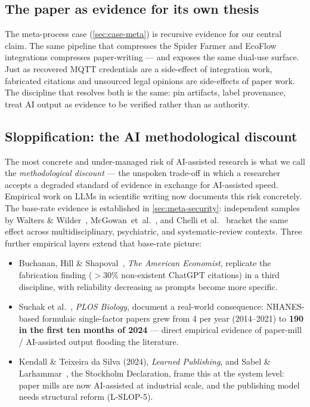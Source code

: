 \documentclass[11pt,a4paper]{article}
\begin{document}
\subsection{The paper as evidence for its own thesis}
\label{sec:disc-recursion}
The meta-process case (\cref{sec:case-meta}) is recursive evidence for
our central claim. The same pipeline that compresses the Spider Farmer
and EcoFlow integrations compresses paper-writing --- and exposes the
same dual-use surface. Just as recovered MQTT credentials are a
side-effect of integration work, fabricated citations and unsourced
legal opinions are side-effects of paper work. The discipline that
resolves both is the same: pin artifacts, label provenance, treat AI
output as evidence to be verified rather than as authority.

\subsection{Sloppification: the AI methodological discount}
\label{sec:disc-sloppification}
The most concrete and under-managed risk of AI-assisted research is what
we call the \emph{methodological discount} --- the unspoken trade-off in
which a researcher accepts a degraded standard of evidence in exchange
for AI-assisted speed. Empirical work on LLMs in scientific writing now
documents this risk concretely.
The base-rate evidence is established in
\cref{sec:meta-security}: independent samples by Walters \&
Wilder~\citep{walters2023fabricated},
McGowan~et~al.~\citep{mcgowan2023chatgpt}, and Chelli et
al.~\citep{chelli2024hallucination} bracket the same effect across
multidisciplinary, psychiatric, and systematic-review contexts. Three
further empirical layers extend that base-rate picture:
\begin{itemize}
  \item Buchanan, Hill \& Shapoval~\citep{buchanan2024fabricated},
        \emph{The American Economist}, replicate the fabrication
        finding ($>$30\% non-existent ChatGPT citations) in a third
        discipline, with reliability decreasing as prompts become more
        specific.
  \item Suchak et al.~\citep{suchak2025nhanes}, \emph{PLOS Biology},
        document a real-world consequence: NHANES-based formulaic
        single-factor papers grew from 4 per year (2014--2021) to
        \textbf{190 in the first ten months of 2024} --- direct
        empirical evidence of paper-mill / AI-assisted output flooding
        the literature.
  \item Kendall \& Teixeira da Silva (2024), \emph{Learned Publishing},
        and Sabel \& Larhammar~\citep{sabel2025stockholm}, the
        Stockholm Declaration, frame this at the system level: paper
        mills are now AI-assisted at industrial scale, and the
        publishing model needs structural reform (L-SLOP-5).
\end{itemize}
\end{document}
